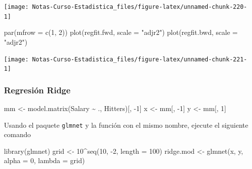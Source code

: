 \documentclass[
  12pt,
]{book}
\newenvironment{Shaded}{\begin{snugshade}}{\end{snugshade}}
\newcommand{\AttributeTok}[1]{\textcolor[rgb]{0.77,0.63,0.00}{#1}}
\newcommand{\DecValTok}[1]{\textcolor[rgb]{0.00,0.00,0.81}{#1}}
\newcommand{\FunctionTok}[1]{\textcolor[rgb]{0.00,0.00,0.00}{#1}}
\newcommand{\NormalTok}[1]{#1}
\newcommand{\OtherTok}[1]{\textcolor[rgb]{0.56,0.35,0.01}{#1}}
\newcommand{\SpecialCharTok}[1]{\textcolor[rgb]{0.00,0.00,0.00}{#1}}
\newcommand{\StringTok}[1]{\textcolor[rgb]{0.31,0.60,0.02}{#1}}
\begin{document}
\begin{center}\texttt{[image: Notas-Curso-Estadistica\_files/figure-latex/unnamed-chunk-220-1]} \end{center}

\begin{Shaded}
\begin{Highlighting}[]
\FunctionTok{par}\NormalTok{(}\AttributeTok{mfrow =} \FunctionTok{c}\NormalTok{(}\DecValTok{1}\NormalTok{, }\DecValTok{2}\NormalTok{))}
\FunctionTok{plot}\NormalTok{(regfit.fwd, }\AttributeTok{scale =} \StringTok{"adjr2"}\NormalTok{)}
\FunctionTok{plot}\NormalTok{(regfit.bwd, }\AttributeTok{scale =} \StringTok{"adjr2"}\NormalTok{)}
\end{Highlighting}
\end{Shaded}

\begin{center}\texttt{[image: Notas-Curso-Estadistica\_files/figure-latex/unnamed-chunk-221-1]} \end{center}

\hypertarget{regresiuxf3n-ridge-1}{%
\subsubsection{Regresión Ridge}\label{regresiuxf3n-ridge-1}}

\begin{Shaded}
\begin{Highlighting}[]
\NormalTok{mm }\OtherTok{\textless{}{-}} \FunctionTok{model.matrix}\NormalTok{(Salary }\SpecialCharTok{\textasciitilde{}}\NormalTok{ ., Hitters)[, }\SpecialCharTok{{-}}\DecValTok{1}\NormalTok{]}
\NormalTok{x }\OtherTok{\textless{}{-}}\NormalTok{ mm[, }\SpecialCharTok{{-}}\DecValTok{1}\NormalTok{]}
\NormalTok{y }\OtherTok{\textless{}{-}}\NormalTok{ mm[, }\DecValTok{1}\NormalTok{]}
\end{Highlighting}
\end{Shaded}

Usando el paquete \texttt{glmnet} y la función con el mismo nombre,
ejecute el siguiente comando

\begin{Shaded}
\begin{Highlighting}[]
\FunctionTok{library}\NormalTok{(glmnet)}
\NormalTok{grid }\OtherTok{\textless{}{-}} \DecValTok{10}\SpecialCharTok{\^{}}\FunctionTok{seq}\NormalTok{(}\DecValTok{10}\NormalTok{, }\SpecialCharTok{{-}}\DecValTok{2}\NormalTok{, }\AttributeTok{length =} \DecValTok{100}\NormalTok{)}
\NormalTok{ridge.mod }\OtherTok{\textless{}{-}} \FunctionTok{glmnet}\NormalTok{(x, y, }\AttributeTok{alpha =} \DecValTok{0}\NormalTok{, }\AttributeTok{lambda =}\NormalTok{ grid)}
\end{Highlighting}
\end{Shaded}
\end{document}
